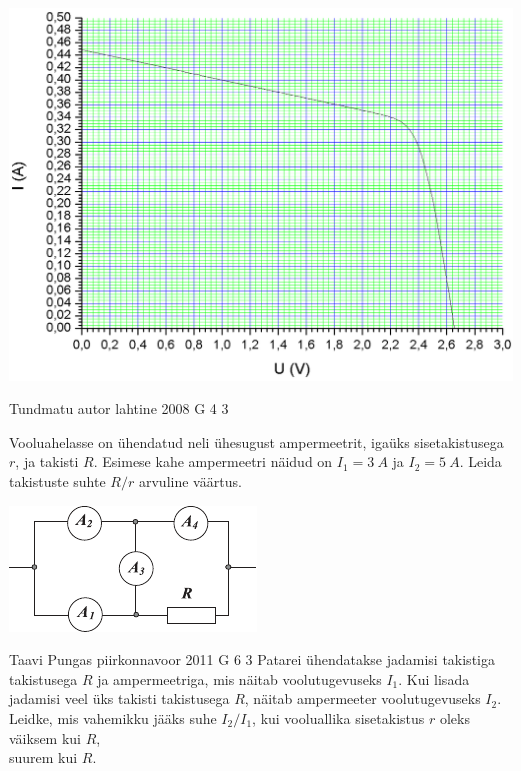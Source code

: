 \documentclass[11pt]{article}
\begin{document}
{{\begin{center}
	\includegraphics[width=0.9\linewidth]{2010-v3g-03-paneel_yl.png}
\end{center}
\fi
}

{Tundmatu autor} %
{lahtine} %
{2008} %
{G 4} %
{3} %
{
\ifStatement
Vooluahelasse on ühendatud neli ühesugust ampermeetrit, igaüks sisetakistusega $r$, ja takisti $R$. Esimese kahe ampermeetri näidud on $I_1= \SI{3}{A}$ ja $I_2= \SI{5}{A}$. Leida takistuste suhte $R/r$ arvuline väärtus.

\begin{center}
	\includegraphics[width=0.6\linewidth]{2008-lahg-04-yl}
\end{center}
\fi
}

{Taavi Pungas} %
{piirkonnavoor} %
{2011} %
{G 6} %
{3} %
{
\ifStatement
Patarei ühendatakse jadamisi takistiga takistusega $R$ ja ampermeetriga, mis näitab voolutugevuseks $I_1$. Kui lisada jadamisi veel üks takisti takistusega $R$, näitab ampermeeter voolutugevuseks $I_2$. Leidke, mis vahemikku jääks suhe $I_2/I_1$, kui vooluallika sisetakistus $r$ oleks\\
\osa väiksem kui $R$,\\
\osa suurem kui $R$.
\fi
}

}
\end{document}
